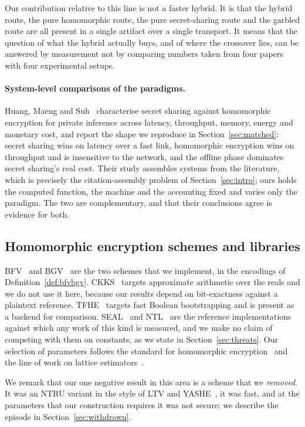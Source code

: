 \documentclass[11pt]{article}
\begin{document}
Our contribution relative to this line is not a faster hybrid. It is that the hybrid route,
the pure homomorphic route, the pure secret-sharing route and the garbled route are all present in
a single artifact over a single transport. It means that the question of what the hybrid actually
buys, and of where the crossover lies, can be answered by measurement not by comparing
numbers taken from four papers with four experimental setups.

\paragraph{System-level comparisons of the paradigms.} Huang, Maeng and
Suh~\cite{BeyondLatency} characterise secret sharing against homomorphic
encryption for private inference across latency, throughput, memory, energy and
monetary cost, and report the shape we reproduce in Section~\ref{sec:matched}:
secret sharing wins on latency over a fast link, homomorphic encryption wins on
throughput and is insensitive to the network, and the offline phase dominates
secret sharing's real cost. Their study assembles systems from the literature,
which is precisely the citation-assembly problem of Section~\ref{sec:intro}; ours
holds the computed function, the machine and the accounting fixed and varies only
the paradigm. The two are complementary, and that their conclusions agree is
evidence for both.

\subsection{Homomorphic encryption schemes and libraries}
\label{sec:related:he}

BFV~\cite{FV} and BGV~\cite{BGV} are the two schemes that we implement, in the encodings of
Definition~\ref{def:bfvbgv}. CKKS~\cite{CKKS} targets approximate arithmetic over the reals and we
do not use it here, because our results depend on bit-exactness against a plaintext reference.
TFHE~\cite{TFHE,TFHErs} targets fast Boolean bootstrapping and is present as a backend for
comparison. SEAL~\cite{SEAL} and NTL~\cite{NTL} are the reference implementations against which any
work of this kind is measured, and we make no claim of competing with them on constants, as we
state in Section~\ref{sec:threats}. Our selection of parameters follows the standard for
homomorphic encryption~\cite{HEStandard} and the line of work on lattice
estimators~\cite{ABDucas,DucasvanWoerden,KirchnerFouque}.

We remark that our one negative result in this area is a scheme that we \emph{removed}. It was an
NTRU variant in the style of LTV and YASHE~\cite{LTV,YASHE}, it was fast, and at the parameters that
our construction requires it was not secure; we describe the episode in
Section~\ref{sec:withdrawn}.
\end{document}
